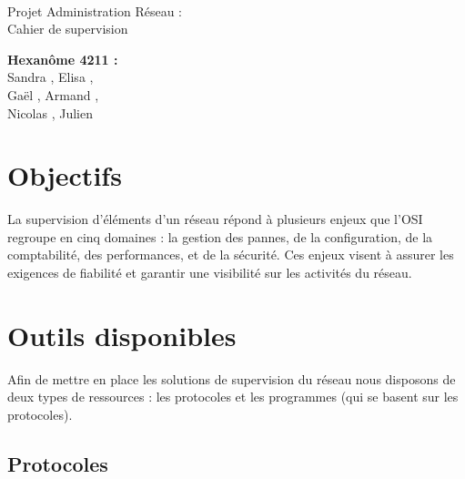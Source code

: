 \documentclass[a4paper]{article}
\begin{document}
\begin{titlepage}
	~ 
	\vfill
	\begin{center}
		\begin{Huge}
			Projet Administration Réseau : \\ Cahier de supervision\\
		\end{Huge}
	\vfill
		\textbf{Hexanôme 4211 :} 
			\\Sandra {}, Elisa , 
			\\Gaël , Armand , 
			\\Nicolas {}, Julien \\
	\vfill
	\end{center}
	\vfill
\end{titlepage}

\newpage
\tableofcontents
\newpage


\section{Objectifs}
La supervision d'éléments d'un réseau répond à plusieurs enjeux que l'OSI regroupe en cinq domaines : la gestion des pannes, de la configuration, de la comptabilité, des performances, et de la sécurité. Ces enjeux visent à assurer les exigences de fiabilité et garantir une visibilité sur les activités du réseau.  

\section{Outils disponibles}

Afin de mettre en place les solutions de supervision du réseau nous disposons de deux types de ressources : les protocoles et les programmes (qui se basent sur les protocoles).\\ 

\subsection{Protocoles}
\end{document}

